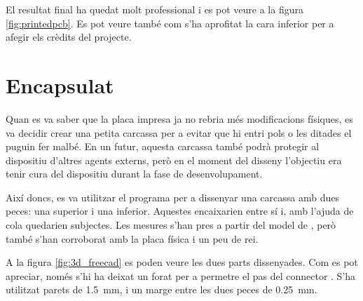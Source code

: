 El resultat final ha quedat molt professional i es pot veure a la figura
\ref{fig:printedpcb}. Es pot veure també com s'ha aprofitat la cara inferior
per a afegir els crèdits del projecte.

\section{Encapsulat}

Quan es va saber que la placa impresa ja no rebria més modificacions físiques,
es va decidir crear una petita carcassa per a evitar que hi entri pols o les
ditades el puguin fer malbé. En un futur, aquesta carcassa també podrà protegir
al dispositiu d'altres agents externs, però en el moment del disseny l'objectiu
era tenir cura del dispositiu durant la fase de desenvolupament.

Així doncs, es va utilitzar el programa  per a dissenyar una
carcassa amb dues peces: una superior i una inferior. Aquestes encaixarien entre
sí i, amb l'ajuda de cola quedarien subjectes. Les mesures s'han pres a partir
del model de , però també s'han corroborat amb la placa física i un
peu de rei.

A la figura \ref{fig:3d_freecad} es poden veure les dues parts dissenyades. Com es pot
apreciar, només s'hi ha deixat un forat per a permetre el pas del connector
. S'ha utilitzat parets de \SI{1.5}{\milli\meter}, i un marge entre
les dues peces de \SI{0.25}{\milli\meter}.

